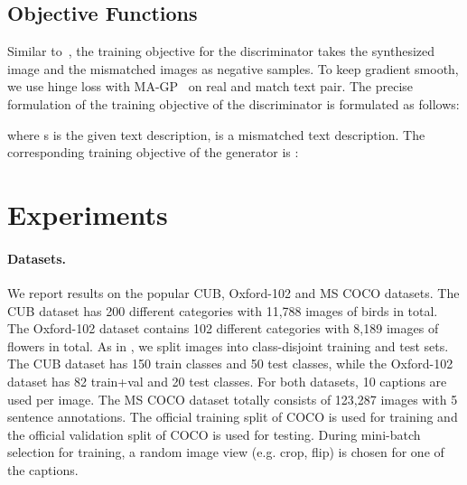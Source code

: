 \documentclass{article}
\begin{document}
	\subsection{Objective Functions}
	Similar to~\cite{DBLP:conf/icml/ReedAYLSL16}, the training objective for the discriminator takes the synthesized image and the mismatched images as negative samples. To keep gradient smooth, we use hinge loss with MA-GP~\cite{DBLP:journals/corr/abs-2008-05865} on real and match text pair. The precise formulation of the training objective of the discriminator is formulated as follows:
	
	where s is the given text description,  is a mismatched text description. The corresponding training objective of the generator is :
	
	
	\section{Experiments}
	
	\paragraph{Datasets.} We report results on the popular CUB, Oxford-102 and MS COCO datasets. The CUB dataset has 200 different categories with 11,788 images of birds in total. The Oxford-102 dataset contains 102 different categories with 8,189 images of flowers in total. As in \cite{reed2016learning,reed2016generative}, we split images into class-disjoint training and test sets. The CUB dataset has 150 train classes and 50 test classes, while the Oxford-102 dataset has 82 train+val and 20 test classes. For both datasets, 10 captions are used per image. The MS COCO dataset totally consists of 123,287 images with 5 sentence annotations. The official training split of COCO is used for training and the official validation split of COCO is used for testing. During mini-batch selection for training, a random image view (e.g. crop, flip) is chosen for one of the captions. 
	
\end{document}
